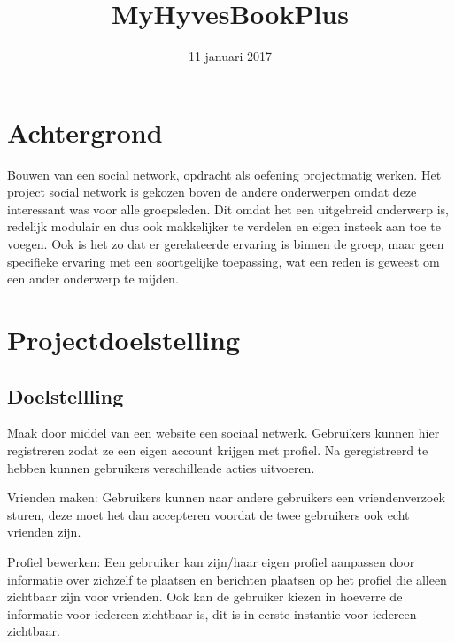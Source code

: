\documentclass{uva-inf-article}
\title{MyHyvesBookPlus}
\date{11 januari 2017}
\begin{document}
\maketitle


\tableofcontents


\section{Achtergrond}
Bouwen van een social network, opdracht als oefening projectmatig werken.
Het project social network is gekozen boven de andere onderwerpen omdat deze interessant was voor alle groepsleden. Dit omdat het een uitgebreid onderwerp is, redelijk modulair en dus ook makkelijker te verdelen en eigen insteek aan toe te voegen. Ook is het zo dat er gerelateerde ervaring is binnen de groep, maar geen specifieke ervaring met een soortgelijke toepassing, wat een reden is geweest om een ander onderwerp te mijden.


\section{Projectdoelstelling}
\subsection{Doelstellling}
Maak door middel van een website een sociaal netwerk. Gebruikers kunnen hier registreren zodat ze een eigen account krijgen met profiel. Na geregistreerd te hebben kunnen gebruikers verschillende acties uitvoeren.

Vrienden maken: Gebruikers kunnen naar andere gebruikers een vriendenverzoek sturen, deze moet het dan accepteren voordat de twee gebruikers ook echt vrienden zijn.

Profiel bewerken: Een gebruiker kan zijn/haar eigen profiel aanpassen door informatie over zichzelf te plaatsen en berichten plaatsen op het profiel die alleen zichtbaar zijn voor vrienden. Ook kan de gebruiker kiezen in hoeverre de informatie voor iedereen zichtbaar is, dit is in eerste instantie voor iedereen zichtbaar.
\end{document}
